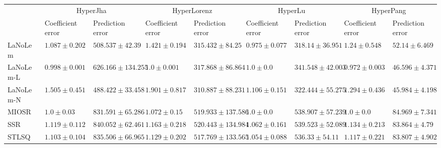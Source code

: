 \begin{table*}
{\begin{tabular}{lllllllll}
 & \multicolumn{2}{c}{HyperJha} & \multicolumn{2}{c}{HyperLorenz} & \multicolumn{2}{c}{HyperLu} & \multicolumn{2}{c}{HyperPang} \\
 & Coefficient error & Prediction error & Coefficient error & Prediction error & Coefficient error & Prediction error & Coefficient error & Prediction error \\
\midrule
LaNoLem & $1.087\pm 0.202$ & $508.537\pm 42.39$ & $1.421\pm 0.194$ & $315.432\pm 84.25$ & $\mathbf{0.975}\pm 0.077$ & $\mathbf{318.14}\pm 36.951$ & $1.24\pm 0.548$ & $52.14\pm 6.469$ \\
LaNoLem-L & $\mathbf{0.998}\pm 0.001$ & $626.166\pm 134.255$ & $\mathbf{1.0}\pm 0.001$ & $317.868\pm 86.864$ & $1.0\pm 0.0$ & $341.548\pm 42.003$ & $\mathbf{0.972}\pm 0.003$ & $46.596\pm 4.371$ \\
LaNoLem-N & $1.505\pm 0.451$ & $\mathbf{488.422}\pm 33.458$ & $1.901\pm 0.817$ & $\mathbf{310.887}\pm 88.231$ & $1.106\pm 0.151$ & $322.444\pm 55.275$ & $1.294\pm 0.436$ & $\mathbf{45.984}\pm 4.198$ \\
MIOSR & $1.0\pm 0.03$ & $831.591\pm 65.286$ & $1.072\pm 0.15$ & $519.933\pm 137.586$ & $1.0\pm 0.0$ & $538.907\pm 57.239$ & $1.0\pm 0.0$ & $84.969\pm 7.341$ \\
SSR & $1.119\pm 0.112$ & $840.052\pm 62.461$ & $1.163\pm 0.218$ & $520.443\pm 134.984$ & $1.062\pm 0.161$ & $539.523\pm 52.089$ & $1.134\pm 0.213$ & $83.864\pm 4.79$ \\
STLSQ & $1.103\pm 0.104$ & $835.506\pm 66.965$ & $1.129\pm 0.202$ & $517.769\pm 133.565$ & $1.054\pm 0.088$ & $536.33\pm 54.11$ & $1.117\pm 0.221$ & $83.807\pm 4.902$ \\

\midrule


\end{tabular}}
\end{table*}

